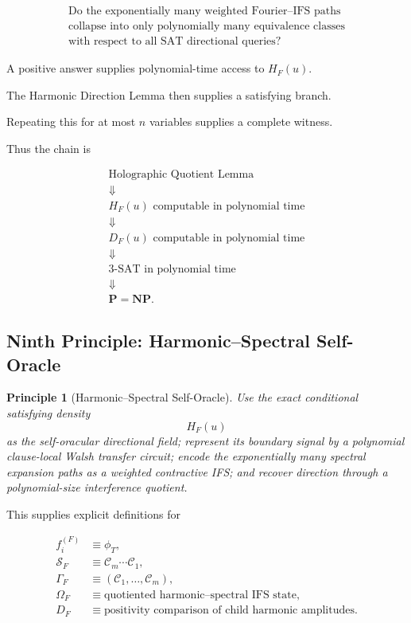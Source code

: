 \documentclass[11pt]{article}
\theoremstyle{plain}
\newtheorem{principle}[theorem]{Principle}
\theoremstyle{definition}
\begin{document}
\[
\boxed{
\begin{array}{c}
\text{Do the exponentially many weighted Fourier--IFS paths}\\
\text{collapse into only polynomially many equivalence classes}\\
\text{with respect to all SAT directional queries?}
\end{array}
}
\]

A positive answer supplies polynomial-time access to \(H_F(u)\).

The Harmonic Direction Lemma then supplies a satisfying branch.

Repeating this for at most \(n\) variables supplies a complete witness.

Thus the chain is

\[
\boxed{
\begin{array}{c}
\text{Holographic Quotient Lemma}
\\
\Downarrow
\\
H_F(u)\text{ computable in polynomial time}
\\
\Downarrow
\\
D_F(u)\text{ computable in polynomial time}
\\
\Downarrow
\\
\text{3-SAT in polynomial time}
\\
\Downarrow
\\
\mathbf{P}=\mathbf{NP}.
\end{array}
}
\]

\subsection{Ninth Principle: Harmonic--Spectral Self-Oracle}

\begin{principle}[Harmonic--Spectral Self-Oracle]
\label{principle:harmonic-spectral-self-oracle}
Use the exact conditional satisfying density
\[
    H_F(u)
\]
as the self-oracular directional field; represent its boundary signal by a
polynomial clause-local Walsh transfer circuit; encode the exponentially many
spectral expansion paths as a weighted contractive IFS; and recover direction
through a polynomial-size interference quotient.
\end{principle}

This supplies explicit definitions for

\[
\boxed{
\begin{aligned}
f_i^{(F)}
&\equiv
\phi_T,
\\
\mathcal{S}_F
&\equiv
\mathcal{C}_m\cdots\mathcal{C}_1,
\\
\Gamma_F
&\equiv
(\mathcal{C}_1,\dots,\mathcal{C}_m),
\\
\Omega_F
&\equiv
\text{quotiented harmonic--spectral IFS state},
\\
D_F
&\equiv
\text{positivity comparison of child harmonic amplitudes}.
\end{aligned}
}
\]
\end{document}
